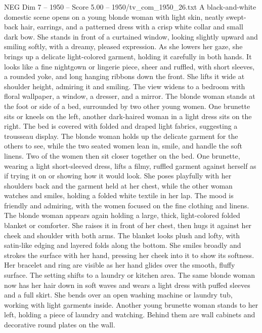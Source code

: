 \begin{textsample}{NEG Dim 7 – 1950 – Score 5.00 – 1950/tv\_com\_1950\_26.txt}  \label{ex:f7_neg_090}
A black-and-white domestic scene opens on a young blonde woman with light skin, neatly swept-back hair, earrings, and a patterned dress with a crisp white collar and small dark bow.
She stands in front of a curtained window, looking slightly upward and smiling softly, with a dreamy, pleased expression.
As she lowers her gaze, she brings up a delicate light-colored garment, holding it carefully in both hands.
It looks like a fine nightgown or lingerie piece, sheer and ruffled, with short sleeves, a rounded yoke, and long hanging ribbons down the front.
She lifts it wide at shoulder height, admiring it and smiling.
The view widens to a bedroom with floral wallpaper, a window, a dresser, and a mirror.
The blonde woman stands at the foot or side of a bed, surrounded by two other young women.
One brunette sits or kneels on the left, another dark-haired woman in a light dress sits on the right.
The bed is covered with folded and draped light fabrics, suggesting a trousseau display.
The blonde woman holds up the delicate garment for the others to see, while the two seated women lean in, smile, and handle the soft linens.
Two of the women then sit closer together on the bed.
One brunette, wearing a light short-sleeved dress, lifts a filmy, ruffled garment against herself as if trying it on or showing how it would look.
She poses playfully with her shoulders back and the garment held at her chest, while the other woman watches and smiles, holding a folded white textile in her lap.
The mood is friendly and admiring, with the women focused on the fine clothing and linens.
The blonde woman appears again holding a large, thick, light-colored folded blanket or comforter.
She raises it in front of her chest, then hugs it against her cheek and shoulder with both arms.
The blanket looks plush and lofty, with satin-like edging and layered folds along the bottom.
She smiles broadly and strokes the surface with her hand, pressing her cheek into it to show its softness.
Her bracelet and ring are visible as her hand glides over the smooth, fluffy surface.
The setting shifts to a laundry or kitchen area.
The same blonde woman now has her hair down in soft waves and wears a light dress with puffed sleeves and a full skirt.
She bends over an open washing machine or laundry tub, working with light garments inside.
Another young brunette woman stands to her left, holding a piece of laundry and watching.
Behind them are wall cabinets and decorative round plates on the wall.

\end{textsample}
